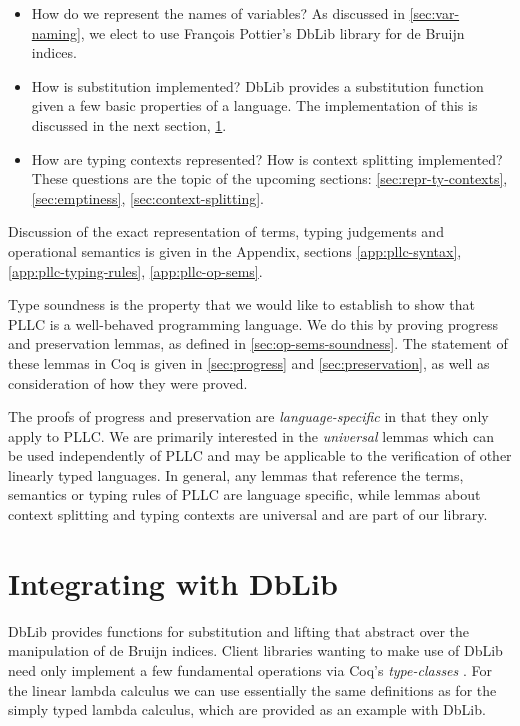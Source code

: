 \documentclass[]{unswthesis}
\newcommand{\Francois}{Fran\frenchc{c}ois }
\let\frenchc\c
\let\c\texttt
\let\i\textit
\begin{document}
\begin{itemize}
\item How do we represent the names of variables? As discussed in \cref{sec:var-naming}, we elect to use \Francois Pottier's DbLib library for de Bruijn indices.
\item How is substitution implemented? DbLib provides a substitution function given a few basic properties of a language. The implementation of this is discussed in the next section, \cref{sec:dblib-int}.
\item How are typing contexts represented? How is context splitting implemented? These questions are the topic of the upcoming sections: \cref{sec:repr-ty-contexts}, \cref{sec:emptiness}, \cref{sec:context-splitting}.
\end{itemize}

Discussion of the exact representation of terms, typing judgements and operational semantics is given in the Appendix, sections \cref{app:pllc-syntax}, \cref{app:pllc-typing-rules}, \cref{app:pllc-op-sems}.

Type soundness is the property that we would like to establish to show that PLLC is a well-behaved programming language. We do this by proving progress and preservation lemmas, as defined in \cref{sec:op-sems-soundness}. The statement of these lemmas in Coq is given in \cref{sec:progress} and \cref{sec:preservation}, as well as consideration of how they were proved.

The proofs of progress and preservation are \i{language-specific} in that they only apply to PLLC. We are primarily interested in the \i{universal} lemmas which can be used independently of PLLC and may be applicable to the verification of other linearly typed languages. In general, any lemmas that reference the terms, semantics or typing rules of PLLC are language specific, while lemmas about context splitting and typing contexts are universal and are part of our library.

\section{Integrating with DbLib}
\label{sec:dblib-int}

DbLib provides functions for substitution and lifting that abstract over the manipulation of de Bruijn indices. Client libraries wanting to make use of DbLib need only implement a few fundamental operations via Coq's \i{type-classes} \cite{coqTypeClasses}. For the linear lambda calculus we can use essentially the same definitions as for the simply typed lambda calculus, which are provided as an example with DbLib.
\end{document}
